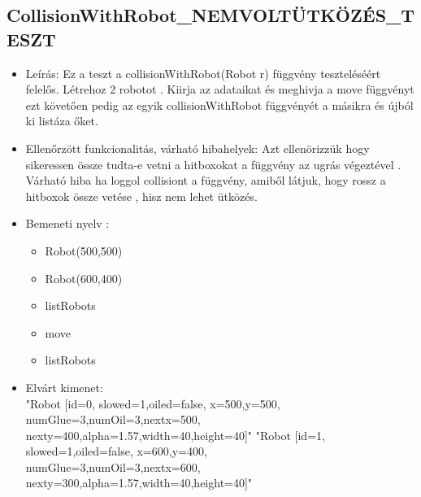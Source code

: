 \subsection{CollisionWithRobot\_NEMVOLTÜTKÖZÉS\_TESZT}
\begin{itemize}
	\item Leírás: Ez a teszt a collisionWithRobot(Robot r) függvény teszteléséért felelős.
			Létrehoz 2 robotot  .
			Kiirja az adataikat  és meghivja a move függvényt ezt követően pedig az egyik collisionWithRobot függvényét a másikra 
			és újból ki listáza őket.			\newline
	\item Ellenőrzött funkcionalitás, várható hibahelyek: Azt ellenörizzük hogy sikeressen össze tudta-e vetni a hitboxokat a függvény az ugrás végeztével .
	Várható hiba ha loggol collisiont a függvény, amiből látjuk, hogy rossz a hitboxok össze vetése , hisz nem lehet ütközés. 
	
	
	\item Bemeneti nyelv :
		\begin{itemize}
		\item Robot(500,500)
		\item Robot(600,400)
		\item listRobots
		\item move
		\item listRobots
		\end{itemize}
	

	\item Elvárt kimenet: \\
		"Robot [id=0,  slowed=1,oiled=false, x=500,y=500, 
		\\numGlue=3,numOil=3,nextx=500,
		\\nexty=400,alpha=1.57,width=40,height=40]"\newline
		"Robot [id=1,  slowed=1,oiled=false, x=600,y=400, 
		\\numGlue=3,numOil=3,nextx=600,
		\\nexty=300,alpha=1.57,width=40,height=40]"
		

\end{itemize}
